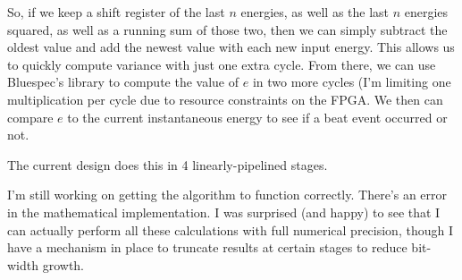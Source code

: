 \documentclass[letterpaper]{article}
\begin{document}
        So, if we keep a shift register of the last $n$ energies, as well as the
        last $n$ energies squared, as well as a running sum of those two, then we
        can simply subtract the oldest value and add the newest value with each new
        input energy.  This allows us to quickly compute variance with just one
        extra cycle.  From there, we can use Bluespec's  library to
        compute the value of $e$ in two more cycles (I'm limiting one
        multiplication per cycle due to resource constraints on the FPGA.  We then
        can compare $e$ to the current instantaneous energy to see if a beat event
        occurred or not.

        The current design does this in 4 linearly-pipelined stages.

        I'm still working on getting the algorithm to function correctly.  There's
        an error in the mathematical implementation.  I was surprised (and happy)
        to see that I can actually perform all these calculations with full
        numerical precision, though I have a mechanism in place to truncate results
        at certain stages to reduce bit-width growth.
\end{document}
